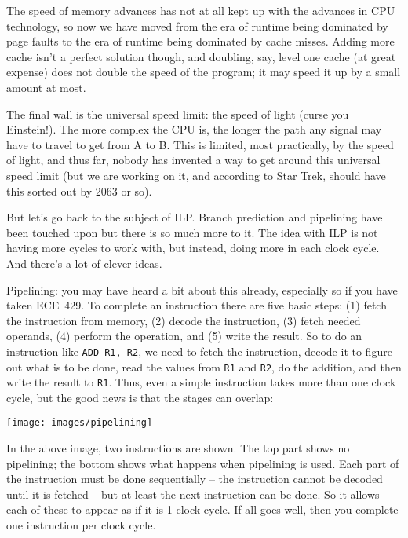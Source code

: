 The speed of memory advances has not at all kept up with the advances in CPU technology, so now we have moved from the era of runtime being dominated by page faults to the era of runtime being dominated by cache misses. Adding more cache isn't a perfect solution though, and doubling, say, level one cache (at great expense) does not double the speed of the program; it may speed it up by a small amount at most. 

The final wall is the universal speed limit: the speed of light (curse you Einstein!). The more complex the CPU is, the longer the path any signal may have to travel to get from A to B. This is limited, most practically, by the speed of light, and thus far, nobody has invented a way to get around this universal speed limit (but we are working on it, and according to Star Trek, should have this sorted out by 2063 or so).

But let's go back to the subject of ILP. Branch prediction and pipelining have been touched upon but there is so much more to it. The idea with ILP is not having more cycles to work with, but instead, doing more in each clock cycle. And there's a lot of clever ideas. 

Pipelining: you may have heard a bit about this already, especially so if you have taken ECE~429. To complete an instruction there are five basic steps: (1) fetch the instruction from memory, (2) decode the instruction, (3) fetch needed operands, (4) perform the operation, and (5) write the result. So to do an instruction like \texttt{ADD R1, R2}, we need to fetch the instruction, decode it to figure out what is to be done, read the values from \texttt{R1} and \texttt{R2}, do the addition, and then write the result to \texttt{R1}. Thus, even a simple instruction takes more than one clock cycle, but the good news is that the stages can overlap:

\begin{center}
\texttt{[image: images/pipelining]}
\end{center}

In the above image, two instructions are shown. The top part shows no pipelining; the bottom shows what happens when pipelining is used. Each part of the instruction must be done sequentially -- the instruction cannot be decoded until it is fetched -- but at least the next instruction can be done. So it allows each of these to appear as if it is 1 clock cycle. If all goes well, then you complete one instruction per clock cycle. 

